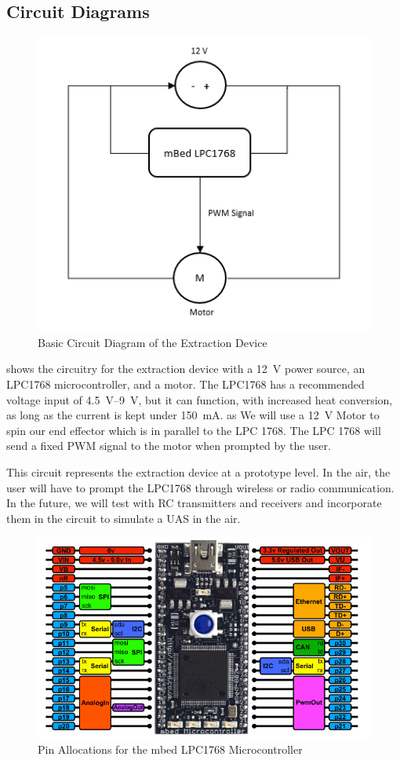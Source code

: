\documentclass{wrcecapstone}
\begin{document}
\subsection{Circuit Diagrams}
\begin{figure}
\begin{center}
\includegraphics[width=0.6\columnwidth]{figures/fig741.png}
\end{center}
\caption{Basic Circuit Diagram of the Extraction Device}
\label{fig:7.4.1}
\end{figure}

 shows the circuitry for the extraction device with a \SI{12}{\volt} power source, an LPC1768 microcontroller, and a motor. The LPC1768 has a recommended voltage input of \SIrange{4.5}{9}{\volt}, but it can function, with increased heat conversion, as long as the current is kept under \SI{150}{\milli\ampere}. as  We will use a \SI{12}{\volt} Motor to spin our end effector which is in parallel to the LPC 1768. The LPC 1768 will send a fixed PWM signal to the motor when prompted by the user.

This circuit represents the extraction device at a prototype level. In the air, the user will have to prompt the LPC1768 through wireless or radio communication. In the future, we will test with RC transmitters and receivers and incorporate them in the circuit to simulate a UAS in the air. 
\begin{figure}
\begin{center}
\includegraphics[width=\columnwidth]{figures/fig742.png}
\end{center}
\caption{Pin Allocations for the mbed LPC1768 Microcontroller \cite{mbed2019}}
\label{fig:7.4.2}
\end{figure}
\end{document}
